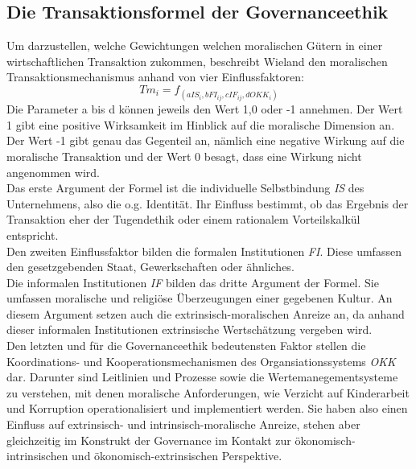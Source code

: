 \documentclass[12pt]{article}
\begin{document}
\subsection{Die Transaktionsformel der Governanceethik}
Um darzustellen, welche Gewichtungen welchen moralischen Gütern in einer wirtschaftlichen Transaktion zukommen, beschreibt Wieland den moralischen Transaktionsmechanismus anhand von vier Einflussfaktoren:
\[Tm_{i}=f_{(aIS_i, bFI_{ij}, cIF_{ij}, dOKK_i)}\]
Die Parameter a bis d können jeweils den Wert 1,0 oder -1 annehmen. Der Wert 1 gibt eine positive Wirksamkeit im Hinblick auf die moralische Dimension an. Der Wert -1 gibt genau das Gegenteil an, nämlich eine negative Wirkung auf die moralische Transaktion und der Wert 0 besagt, dass eine Wirkung nicht angenommen wird.\\
Das erste Argument der Formel ist die individuelle Selbstbindung \textit{IS} des Unternehmens, also die o.g. Identität. Ihr Einfluss bestimmt, ob das Ergebnis der Transaktion eher der Tugendethik oder einem rationalem Vorteilskalkül entspricht.\\
Den zweiten Einflussfaktor bilden die formalen Institutionen \textit{FI}. Diese umfassen den gesetzgebenden Staat, Gewerkschaften oder ähnliches.\\
Die informalen Institutionen \textit{IF} bilden das dritte Argument der Formel. Sie umfassen moralische und religiöse Überzeugungen einer gegebenen Kultur. An diesem Argument setzen auch die extrinsisch-moralischen Anreize an, da anhand dieser informalen Institutionen extrinsische Wertschätzung vergeben wird.\\
Den letzten und für die Governanceethik bedeutensten Faktor stellen die Koordinations- und Kooperationsmechanismen des Organsiationssystems \textit{OKK} dar. Darunter sind Leitlinien und Prozesse sowie die Wertemanegementsysteme zu verstehen, mit denen moralische Anforderungen, wie Verzicht auf Kinderarbeit und Korruption operationalisiert und implementiert werden. Sie haben also einen Einfluss auf extrinsisch- und intrinsisch-moralische Anreize, stehen aber gleichzeitig im Konstrukt der Governance im Kontakt zur ökonomisch-intrinsischen und ökonomisch-extrinsischen Perspektive.
\end{document}
